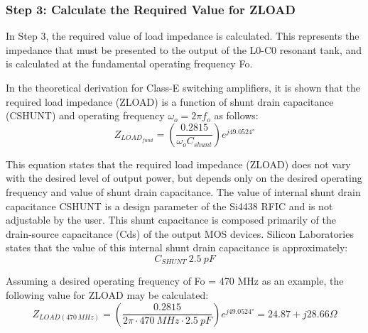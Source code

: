       \subsubsection{Step 3: Calculate the Required Value for ZLOAD}
        In Step 3, the required value of load impedance is calculated. This represents the impedance that 
        must be presented to the output of the L0-C0 resonant tank, and is calculated at the fundamental 
        operating frequency Fo.
        
        In the theoretical derivation for Class-E switching amplifiers, it is shown that the required load 
        impedance (ZLOAD) is a function of shunt drain capacitance (CSHUNT) and operating frequency 
        \(\omega_o = 2\pi f_o\) as follows:
        \begin{equation}\label{EXP001:eq_spirit02}
          Z_{LOAD_{fund}} = \left(\frac{0.2815}{\omega_oC_{shunt}}\right)e^{j49.0524°}
        \end{equation}
        
        This equation states that the required load impedance (ZLOAD) does not vary with the desired level 
        of output power, but depends only on the desired operating frequency and value of shunt drain 
        capacitance. The value of internal shunt drain capacitance CSHUNT is a design parameter of the 
        Si4438 RFIC and is not adjustable by the user. This shunt capacitance is composed primarily of the 
        drain-source capacitance (Cds) of the output MOS devices. Silicon Laboratories states that the 
        value of this internal shunt drain capacitance is approximately:          
        \begin{equation}\label{EXP001:eq_spirit03}
          C_{SHUNT} ~ \qty{2.5}{pF}
        \end{equation}          
        
        Assuming a desired operating frequency of Fo = 470 MHz as an example, the following value for ZLOAD 
        may be calculated:
        \begin{equation}\label{EXP001:eq_spirit04}
          Z_{LOAD(470\,MHz)} = 
            \left(\frac{0.2815}{2\pi\cdot\qty{470}{MHz}\cdot\qty{2.5}{pF}}\right)e^{j49.0524°} =
            24.87 + j28.66\Omega
        \end{equation} 
        
